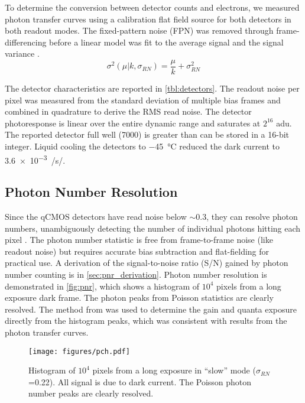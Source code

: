 To determine the conversion between detector counts and electrons, we measured photon transfer curves using a calibration flat field source for both detectors in both readout modes. The fixed-pattern noise (FPN) was removed through frame-differencing before a linear model was fit to the average signal and the signal variance \citep{janesick_photon_2007,stefanov_cmos_2022}. 
\begin{equation}
    \sigma^2\left(\mu | k, \sigma_{RN}\right) = \frac{\mu}{k} + \sigma^2_{RN}
\end{equation}

The detector characteristics are reported in \autoref{tbl:detectors}. The readout noise per pixel was measured from the standard deviation of multiple bias frames and combined in quadrature to derive the RMS read noise. The detector photoresponse is linear over the entire dynamic range and saturates at $2^{16}$ \si{adu}. The reported detector full well (\SI{7000}{\electron}) is greater than can be stored in a 16-bit integer. Liquid cooling the detectors to \SI{-45}{\celsius} reduced the dark current to \SI{3.6e-3}{\electron/\second/\pixel}.

\subsection{Photon Number Resolution}

Since the qCMOS detectors have read noise below $\sim$\SI{0.3}{\electron}, they can resolve photon numbers, unambiguously detecting the number of individual photons hitting each pixel  \citep{starkey_determining_2016}. The photon number statistic is free from frame-to-frame noise (like readout noise) but requires accurate bias subtraction and flat-fielding for practical use. A derivation of the signal-to-noise ratio (S/N) gained by photon number counting is in \autoref{sec:pnr_derivation}. Photon number resolution is demonstrated in \autoref{fig:pnr}, which shows a histogram of $10^4$ pixels from a long exposure dark frame. The photon peaks from Poisson statistics are clearly resolved. The method from \citet{starkey_determining_2016} was used to determine the gain and quanta exposure directly from the histogram peaks, which was consistent with results from the photon transfer curves.

\begin{figure}
    \centering
    \texttt{[image: figures/pch.pdf]}
    \caption{Histogram of $10^4$ pixels from a long exposure in ``slow'' mode ($\sigma_{RN}$=\SI{0.22}{\electron}). All signal is due to dark current. The Poisson photon number peaks are clearly resolved.\label{fig:pch}}
\end{figure}

